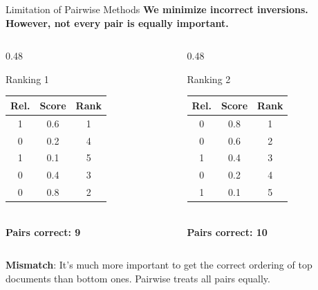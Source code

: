 \documentclass[aspectratio=169]{beamer}
\newif\ifanimated
\newcommand{\cpause}{\ifanimated\pause\fi}
\begin{document}
\begin{frame}{Limitation of Pairwise Methods}
\textbf{We minimize incorrect inversions. However, not every pair is equally important.}

\vspace{0.8em}
\begin{columns}[T]
\begin{column}{0.48\textwidth}
\begin{block}{Ranking 1}
\centering
\begin{tabular}{ccc}
\toprule
\textbf{Rel.} & \textbf{Score} & \textbf{Rank}\\
\midrule
1 & 0.6 & 1\\
0 & 0.2 & 4\\
1 & 0.1 & 5\\
0 & 0.4 & 3\\
0 & 0.8 & 2\\
\bottomrule
\end{tabular}\\
\vspace{0.3em}
\textbf{Pairs correct: 9}
\end{block}
\end{column}

\begin{column}{0.48\textwidth}
\begin{alertblock}{Ranking 2}
\centering
\begin{tabular}{ccc}
\toprule
\textbf{Rel.} & \textbf{Score} & \textbf{Rank}\\
\midrule
0 & 0.8 & 1\\
0 & 0.6 & 2\\
1 & 0.4 & 3\\
0 & 0.2 & 4\\
1 & 0.1 & 5\\
\bottomrule
\end{tabular}\\
\vspace{0.3em}
\textbf{Pairs correct: 10}
\end{alertblock}
\end{column}
\end{columns}

\cpause
\vspace{1em}
\textbf{Mismatch}: It's much more important to get the correct ordering of top documents than bottom ones. Pairwise treats all pairs equally.
\end{frame}
\end{document}
